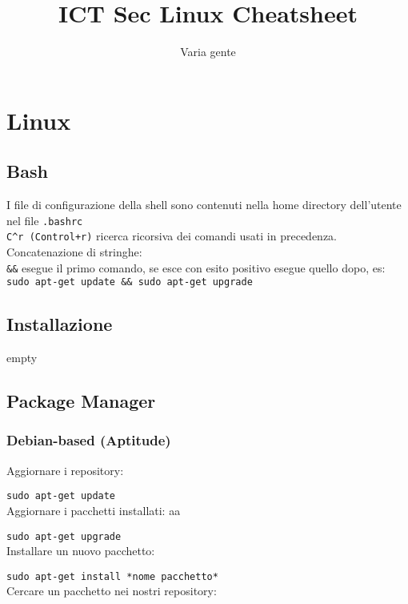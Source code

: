 \documentclass[]{report}
\title{ICT Sec Linux Cheatsheet}
\author{Varia gente}
\begin{document}
\maketitle
\tableofcontents

\chapter{Linux}
\section{Bash}

I file di configurazione della shell sono contenuti nella home directory dell'utente nel file \verb|.bashrc|\\

\noindent \verb|C^r (Control+r)| ricerca ricorsiva dei comandi usati in precedenza.\\

\noindent Concatenazione di stringhe:\\
\noindent \verb|&&| esegue il primo comando, se esce con esito positivo esegue quello dopo, es:
\verb|sudo apt-get update && sudo apt-get upgrade| \\



\section{Installazione}
empty
\newpage
\section{Package Manager}
\subsection{Debian-based (Aptitude)}
\noindent Aggiornare i repository:

\verb|sudo apt-get update|\\

\noindent Aggiornare i pacchetti installati: aa

\verb|sudo apt-get upgrade|\\

\noindent Installare un nuovo pacchetto:

\verb|sudo apt-get install *nome pacchetto*|\\

\noindent Cercare un pacchetto nei nostri repository:
\end{document}
